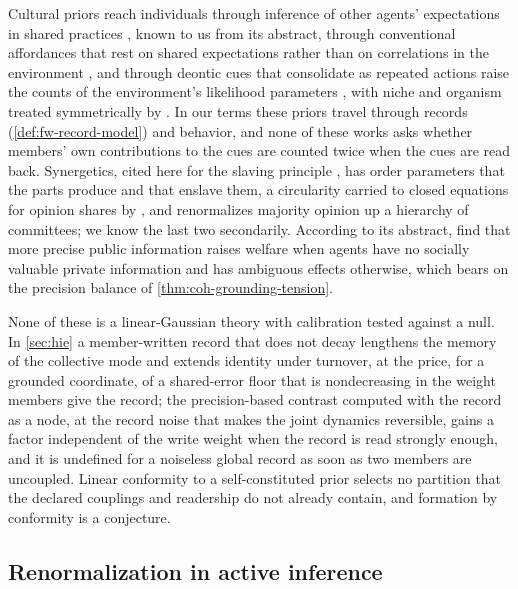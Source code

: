 Cultural priors reach individuals through inference of other agents' expectations in shared practices \citep{veissiere2020thinking}, known to us from its abstract, through conventional affordances that rest on shared expectations rather than on correlations in the environment \citep{ramstead2016cultural}, and through deontic cues that consolidate as repeated actions raise the counts of the environment's likelihood parameters \citep{constant2019regimes}, with niche and organism treated symmetrically by \citet{constant2018variational}. In our terms these priors travel through records (\cref{def:fw-record-model}) and behavior, and none of these works asks whether members' own contributions to the cues are counted twice when the cues are read back. Synergetics, cited here for the slaving principle \citep{haken1983synergetics}, has order parameters that the parts produce and that enslave them, a circularity carried to closed equations for opinion shares by \citet{weidlich1991physics}, and \citet{galam1986majority} renormalizes majority opinion up a hierarchy of committees; we know the last two secondarily. According to its abstract, \citet{morris2002social} find that more precise public information raises welfare when agents have no socially valuable private information and has ambiguous effects otherwise, which bears on the precision balance of \cref{thm:coh-grounding-tension}.

None of these is a linear-Gaussian theory with calibration tested against a null. In \cref{sec:hie} a member-written record that does not decay lengthens the memory of the collective mode and extends identity under turnover, at the price, for a grounded coordinate, of a shared-error floor that is nondecreasing in the weight members give the record; the precision-based contrast computed with the record as a node, at the record noise that makes the joint dynamics reversible, gains a factor independent of the write weight when the record is read strongly enough, and it is undefined for a noiseless global record as soon as two members are uncoupled. Linear conformity to a self-constituted prior selects no partition that the declared couplings and readership do not already contain, and formation by conformity is a conjecture.

\subsection{Renormalization in active inference}\label{sec:rel-renormalization}

